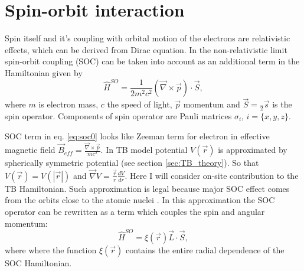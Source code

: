 \section{Spin-orbit interaction}
\label{sec:soc_theory}
Spin itself and it's coupling with orbital motion of the electrons are relativistic effects, which can be derived from Dirac equation. In the non-relativistic limit spin-orbit coupling (SOC) can be taken into account as an additional term in the Hamiltonian given by
\begin{equation} \label{eq:soc0}
	\hat{H}^{SO} = \frac{1}{2 m^2 c^2} (\vec{\nabla} \times \vec{p}) \cdot \vec{S},
\end{equation}
where $m$ is electron mass, $c$ the speed of light, $\vec{p}$ momentum and $\vec{S} = \frac{}{2} \vec{s}$ is the spin operator. Components of spin operator are Pauli matrices $\sigma_i$, $i = \{x, y, z\}$.

SOC term in eq. \ref{eq:soc0} looks like Zeeman term for electron in effective magnetic field $\vec{B}_{eff} = \frac{\vec{\nabla} \times \vec{p}}{m c^2}$. In TB model potential $V(\vec{r})$ is approximated by spherically symmetric potential (see section \ref{sec:TB_theory}). So that $V(\vec{r}) = V(|\vec{r}|)$ and $\vec{\nabla} V = \frac{\vec{r}}{r} \frac{dV}{dr}$. Here I will consider on-site contribution to the TB Hamiltonian. Such approximation is legal because major SOC effect comes from the orbits close to the atomic nuclei \cite{soc}. In this approximation the SOC operator can be rewritten as a term which couples the spin and angular momentum: 
\begin{equation} \label{eq:hsoc}
	\hat{H}^{SO} =  \xi(\vec{r}) \vec{L} \cdot \vec{S},
\end{equation}
where where the function $\xi(\vec{r})$ contains the entire radial dependence of the SOC Hamiltonian.

